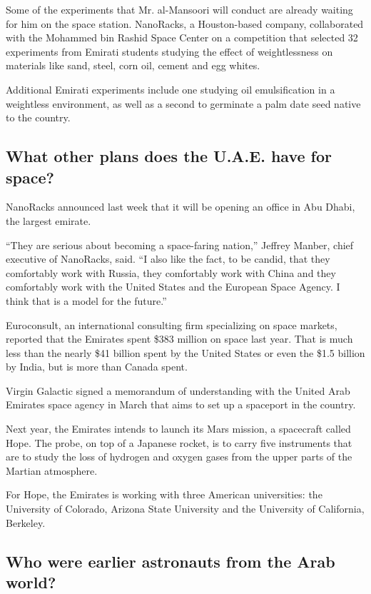 Some of the experiments that Mr. al-Mansoori will conduct are already
waiting for him on the space station. NanoRacks, a Houston-based
company, collaborated with the Mohammed bin Rashid Space Center on a
competition that selected 32 experiments from Emirati students studying
the effect of weightlessness on materials like sand, steel, corn oil,
cement and egg whites.

Additional Emirati experiments include one studying oil emulsification
in a weightless environment, as well as a second to germinate a palm
date seed native to the country.

\hypertarget{what-other-plans-does-the-uae-have-for-space}{%
\subsection{What other plans does the U.A.E. have for
space?}\label{what-other-plans-does-the-uae-have-for-space}}

NanoRacks announced last week that it will be opening an office in Abu
Dhabi, the largest emirate.

``They are serious about becoming a space-faring nation,'' Jeffrey
Manber, chief executive of NanoRacks, said. ``I also like the fact, to
be candid, that they comfortably work with Russia, they comfortably work
with China and they comfortably work with the United States and the
European Space Agency. I think that is a model for the future.''

Euroconsult, an international consulting firm specializing on space
markets, reported that the Emirates spent \$383 million on space last
year. That is much less than the nearly \$41 billion spent by the United
States or even the \$1.5 billion by India, but is more than Canada
spent.

Virgin Galactic signed a memorandum of understanding with the United
Arab Emirates space agency in March that aims to set up a spaceport in
the country.

Next year, the Emirates intends to launch its Mars mission, a spacecraft
called Hope. The probe, on top of a Japanese rocket, is to carry five
instruments that are to study the loss of hydrogen and oxygen gases from
the upper parts of the Martian atmosphere.

For Hope, the Emirates is working with three American universities: the
University of Colorado, Arizona State University and the University of
California, Berkeley.

\hypertarget{who-were-earlier-astronauts-from-the-arab-world}{%
\subsection{Who were earlier astronauts from the Arab
world?}\label{who-were-earlier-astronauts-from-the-arab-world}}

